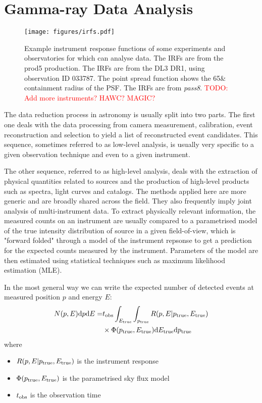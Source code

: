 \documentclass[traditabstract, longauth]{aa}
\newcommand{\todo}[1]{\textcolor{red}{TODO: #1}\PackageWarning{TODO:}{#1!}}
\begin{document}
\section{Gamma-ray Data Analysis}
\label{sec:gammaray-data-analysis}
%
\begin{figure*}[ht!]
	\centering
	\texttt{[image: figures/irfs.pdf]}
	\caption{
		Example instrument response functions of some experiments and
        observatories for which \gammapy can analyse data. The \cta IRFs
        are from the prod5 production. The \hess IRFs are from the DL3 DR1,
        using observation ID 033787. The point spread function shows the 65\&
        containment radius of the PSF. The \fermi IRFs are from \textit{pass8}.
        \todo{Add more instruments? HAWC? MAGIC?}
    }
	\label{fig:irfs}
\end{figure*}
%
The data reduction process in \gammaray astronomy is usually split into two parts.
The first one deals with the data processing from camera measurement, calibration, event
reconstruction and selection to yield a list of reconstructed \gammaray event candidates.
This sequence, sometimes referred to as low-level analysis, is usually very specific to
a given observation technique and even to a given instrument.

The other sequence, referred to as high-level analysis, deals with the extraction of physical
quantities related to \gammaray sources and the production of high-level products such as spectra,
light curves and catalogs. The methods applied here are more generic and are broadly
shared across the field. They also frequently imply joint analysis of multi-instrument data.
To extract physically relevant information, the measured counts on an instrument are usually
compared to a parametrised model of the true intensity distribution of \gammaray source in a given
field-of-view, which is "forward folded" through a model of the instrument repsonse
to get a prediction for the expected counts measured by the instrument. Parameters
of the model are then estimated using statistical techniques such as maximum likelihood
estimation (MLE).

In the most general way we can write the expected number of detected events at measured
position $p$ and energy $E$:
\begin{align}
   N(p, E) {\rm d}p {\rm d}E = &t_{\rm obs} \int_{E_{\rm true}} \int_{p_{\rm true}}  R(p, E|p_{\rm true}, E_{\rm true})\\
   &\times \Phi(p_{\rm true}, E_{\rm true}) {\rm d}E_{\rm true} {\rm d}p_{\rm true}
\end{align}
where
\begin{itemize}
\item $R(p, E| p_{\rm true}, E_{\rm true})$ is the instrument response
\item $\Phi(p_{\rm true}, E_{\rm true})$ is the parametrised sky flux model
\item $t_{\rm obs}$ is the observation time
\end{itemize}
\end{document}

